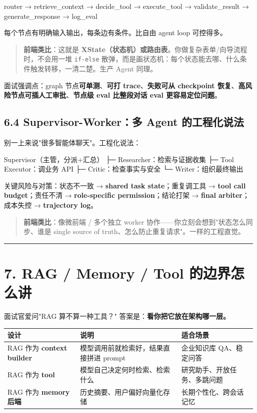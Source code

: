 \begin{codeblock}
router → retrieve_context → decide_tool → execute_tool → validate_result → generate_response → log_eval
\end{codeblock}

每个节点有明确输入输出，每条边有条件。比自由 agent loop 可控得多。

\begin{quote}
 \textbf{前端类比}：这就是 \textbf{XState（状态机）或路由表}。你做复杂表单/向导流程时，不会用一堆 \texttt{if-else} 散弹，而是画状态机：每个状态能去哪、什么条件触发转移，一清二楚。生产 Agent 同理。
\end{quote}

面试强调点：graph 节点\textbf{可单测}、\textbf{可打 trace}、\textbf{失败可从 checkpoint 恢复}、\textbf{高风险节点可插人工审批}、\textbf{节点级 eval 比整段对话 eval 更容易定位问题}。

\subsection{6.4 Supervisor-Worker：多 Agent 的工程化说法}

别一上来说"很多智能体聊天"。工程化说法：

\begin{codeblock}
Supervisor（主管，分派+汇总）
  ├─ Researcher：检索与证据收集
  ├─ Tool Executor：调业务 API
  ├─ Critic：检查事实与安全
  └─ Writer：组织最终输出
\end{codeblock}

关键风险与对策：状态不一致 → \textbf{shared task state}；重复调工具 → \textbf{tool call budget}；责任不清 → \textbf{role-specific permission}；结论打架 → \textbf{final arbiter}；成本失控 → \textbf{trajectory log}。

\begin{quote}
 \textbf{前端类比}：像微前端 / 多个独立 worker 协作——你立刻会想到"状态怎么同步、谁是 single source of truth、怎么防止重复请求"。一样的工程直觉。
\end{quote}

\bigskip\hrule\bigskip

\section{7. RAG / Memory / Tool 的边界怎么讲}

面试官爱问"RAG 算不算一种工具？" 答案是：\textbf{看你把它放在架构哪一层。}

\begingroup
\scriptsize
\setlength{\tabcolsep}{3pt}
\begin{longtable}{|p{}|p{}|p{}|}
\hline
设计 & 说明 & 适合场景 \\ \hline
RAG 作为 \textbf{context builder} & 模型调用前就检索好，结果直接拼进 prompt & 企业知识库 QA、稳定问答 \\ \hline
RAG 作为 \textbf{tool} & 模型自己决定何时检索、检索什么 & 研究助手、开放任务、多跳问题 \\ \hline
RAG 作为 \textbf{memory 后端} & 历史摘要、用户偏好向量化存储 & 长期个性化、跨会话记忆 \\ \hline
\end{longtable}
\endgroup

